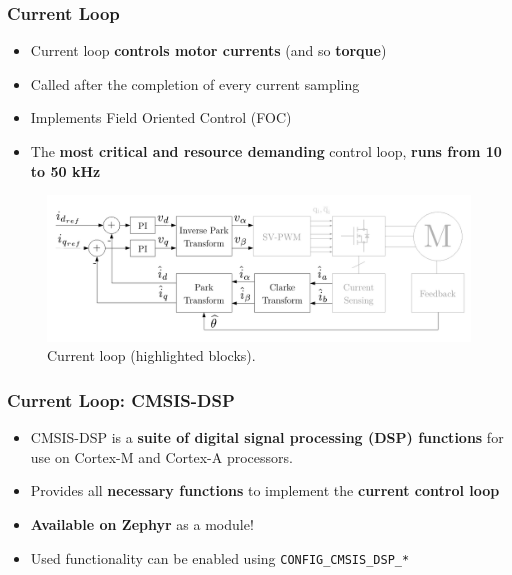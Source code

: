 \documentclass[handout]{beamer}
\begin{document}
\begin{frame}
  \frametitle{Current Loop}

  \begin{itemize}
    \item<1-> Current loop \textbf{controls motor currents} (and so
          \textbf{torque})
    \item<2-> Called after the completion of every current sampling
    \item<3-> Implements Field Oriented Control (FOC)
    \item<4-> The \textbf{most critical and resource demanding} control loop,
          \textbf{runs from 10 to 50 kHz}
  \end{itemize}

  \begin{figure}
    \centering
    \includegraphics[scale=0.4]{cloop-only-schematic.pdf}
    \caption{Current loop (highlighted blocks).}
  \end{figure}
\end{frame}

\begin{frame}
  \frametitle{Current Loop: CMSIS-DSP}

  \begin{itemize}
    \item<1-> CMSIS-DSP is a \textbf{suite of digital signal processing (DSP)
            functions} for use on Cortex-M and Cortex-A processors.
    \item<2-> Provides all \textbf{necessary functions} to implement the
          \textbf{current control loop}
    \item<3-> \textbf{Available on Zephyr} as a module!
    \item<4-> Used functionality can be enabled using
          \texttt{CONFIG\_CMSIS\_DSP\_*}
  \end{itemize}
\end{frame}
\end{document}
